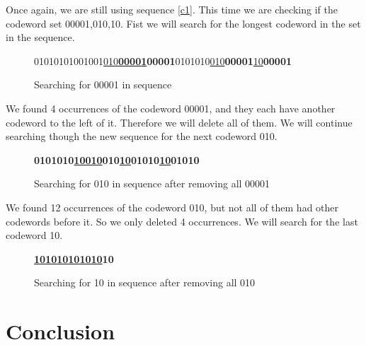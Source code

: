 \documentclass[10pt,letterpaper,notitlepage,draft]{article}
\theoremstyle{definition}
\begin{document}
Once again, we are still using sequence \ref{c1}. 
This time we are checking if the codeword set {00001,010,10}.
Fist we will search for the longest codeword in the set in the sequence.

\begin{figure}[h!]
\begin{center}
01010101001001\underline{010}{\bf\underline{00001}}{\bf00001}0101010\underline{010}{\bf00001}\underline{10}{\bf00001}
\end{center}
\caption{Searching for 00001 in sequence}\label{c4}
\end{figure}

We found 4 occurrences of the codeword 00001, and they each have another codeword to the left of it. 
Therefore we will delete all of them. 
We will continue searching though the new sequence for the next codeword 010.

\begin{figure}[h!]
\begin{center}
{\bf 0101010\underline{10}\underline{010}010\underline{10}01010\underline{10}01010}
\end{center}
\caption{Searching for 010 in sequence after removing all 00001}\label{c5}
\end{figure}

We found 12 occurrences of the codeword 010, but not all of them had other codewords before it. 
So we only deleted 4 occurrences.
We will search for the last codeword 10.

\begin{figure}[h!]
\begin{center}
{\bf \underline{101010101010}10}
\end{center}
\caption{Searching for 10 in sequence after removing all 010}\label{c6}
\end{figure}




\section{Conclusion}

\nocite{*}

%
% 

\end{document}
